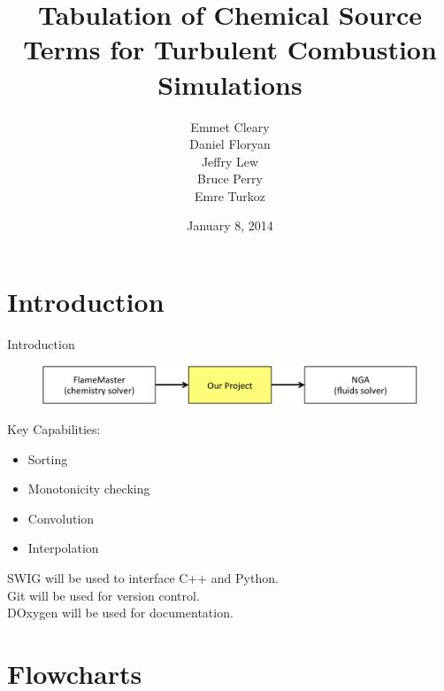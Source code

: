 \documentclass{beamer}
\title[APC 524 Design Review]{Tabulation of Chemical Source Terms for Turbulent Combustion Simulations}
\author{Emmet Cleary \\
Daniel Floryan \\
Jeffry Lew \\
Bruce Perry \\
Emre Turkoz}
\date{January 8, 2014}
\begin{document}
\begin{frame}
  \titlepage
\end{frame}


\section{Introduction}
\begin{frame}{Introduction}
\begin{figure}
\includegraphics[width=\textwidth]{scope.pdf}
\end{figure}
\vskip 5mm
Key Capabilities:
\begin{itemize}
\item Sorting
\item Monotonicity checking
\item Convolution
\item Interpolation
\end{itemize}
\vspace{12pt}
SWIG will be used to interface C++ and Python.\\
Git will be used for version control.\\
DOxygen will be used for documentation.
\end{frame}


\section{Flowcharts}
\end{document}
